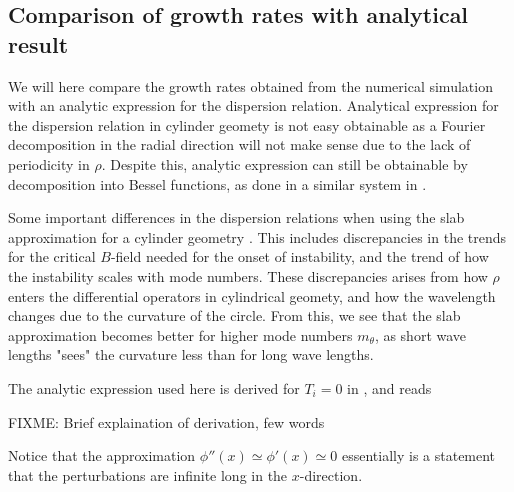 \subsection{Comparison of growth rates with analytical result}
%
We will here compare the growth rates obtained from the numerical simulation with an analytic expression for the dispersion relation.
Analytical expression for the dispersion relation in cylinder geomety is not easy obtainable as a Fourier decomposition in the radial direction will not make sense due to the lack of periodicity in $\rho$. Despite this, analytic expression can still be obtainable by decomposition into Bessel functions, as done in a similar system in \cite{Rasmussen2006a}.

Some important differences in the dispersion relations when using the slab approximation for a cylinder geometry \cite{Ellis1980}.
This includes discrepancies in the trends for the critical $B$-field needed for the onset of instability, and the trend of how the instability scales with mode numbers.
These discrepancies arises from how $\rho$ enters the differential operators in cylindrical geomety, and how the wavelength changes due to the curvature of the circle.
From this, we see that the slab approximation becomes better for higher mode numbers $m_\theta$, as short wave lengths "sees" the curvature less than for long wave lengths.

The analytic expression used here is derived for $T_i=0$ in \cite{Pecseli2016book}, and reads

FIXME: Brief explaination of derivation, few words

Notice that the approximation $\phi''(x)\simeq\phi'(x)\simeq0$ essentially is a statement that the perturbations are infinite long in the $x$-direction.

